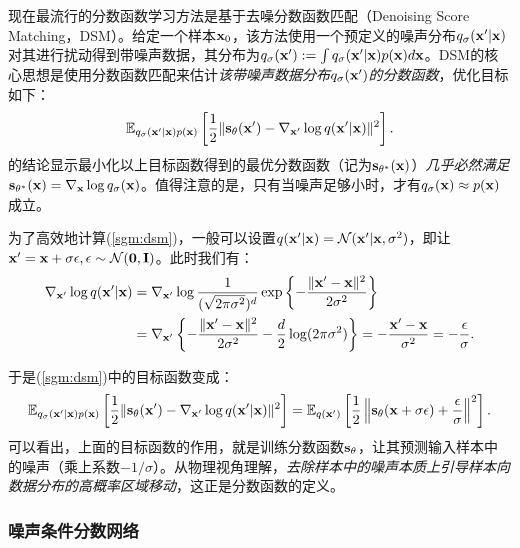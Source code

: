 \documentclass[11pt,a4paper,UTF8]{ctexart}
\begin{document}
现在最流行的分数函数学习方法是基于去噪分数函数匹配（Denoising Score Matching，DSM）\cite{vincent2011connection}。给定一个样本$\mathbf{x}_0$，该方法使用一个预定义的噪声分布$q_\sigma(\mathbf{x}^\prime|\mathbf{x})$对其进行扰动得到带噪声数据，其分布为$q_\sigma(\mathbf{x}^\prime):=\int q_\sigma(\mathbf{x}^\prime|\mathbf{x})p(\mathbf{x})d\mathbf{x}$。DSM的核心思想是使用分数函数匹配来估计\emph{该带噪声数据分布$q_\sigma(\mathbf{x}^\prime)$的分数函数}，优化目标如下：
\begin{equation}
\mathbb{E}_{q_\sigma(\mathbf{x}^\prime|\mathbf{x})p(\mathbf{x})} \left[\frac{1}{2}\| \mathbf{s}_{\theta}(\mathbf{x}^\prime) - \nabla_{\mathbf{x}^\prime}\log q(\mathbf{x}^\prime|\mathbf{x}) \|^2 \right].
\label{sgm:dsm}
\end{equation}
\cite{vincent2011connection}的结论显示最小化以上目标函数得到的最优分数函数（记为$\mathbf{s}_{\theta^*}(\mathbf{x})$）\emph{几乎必然满足}$\mathbf{s}_{\theta^*}(\mathbf{x})=\nabla_{\mathbf{x}}\log q_\sigma(\mathbf{x})$。值得注意的是，只有当噪声足够小时，才有$q_\sigma(\mathbf{x})\approx p(\mathbf{x})$成立。

为了高效地计算(\ref{sgm:dsm})，一般可以设置$q(\mathbf{x}^\prime|\mathbf{x})=\mathcal{N}(\mathbf{x}^\prime|\mathbf{x},\sigma^2)$，即让$\mathbf{x}^\prime=\mathbf{x}+\sigma\epsilon,\epsilon\sim\mathcal{N}(\mathbf{0},\mathbf{I})$。此时我们有：
\begin{align*}
    \nabla_{\mathbf{x}^\prime}\log q(\mathbf{x}^\prime|\mathbf{x}) &= \nabla_{\mathbf{x}^\prime}\log \frac{1}{(\sqrt{2\pi\sigma^2})^d}\exp\left\{-\frac{\|\mathbf{x}^\prime-\mathbf{x} \|^2}{2\sigma^2}\right\} \\
    &= \nabla_{\mathbf{x}^\prime} \left\{ -\frac{\|\mathbf{x}^\prime-\mathbf{x} \|^2}{2\sigma^2} -\frac{d}{2}\log (2\pi\sigma^2) \right\} = -\frac{\mathbf{x}^\prime-\mathbf{x}}{\sigma^2}=-\frac{\epsilon}{\sigma}.
\end{align*}

于是(\ref{sgm:dsm})中的目标函数变成：
\begin{equation}
\mathbb{E}_{q_\sigma(\mathbf{x}^\prime|\mathbf{x})p(\mathbf{x})} \left[\frac{1}{2}\| \mathbf{s}_{\theta}(\mathbf{x}^\prime) - \nabla_{\mathbf{x}^\prime}\log q(\mathbf{x}^\prime|\mathbf{x})  \|^2 \right] = \mathbb{E}_{q(\mathbf{x}^\prime)} \left[ \frac{1}{2}\left\| \mathbf{s}_\theta(\mathbf{x} +\sigma\epsilon)+\frac{\epsilon}{\sigma} \right\|^2\right].
\label{sgm:dsm_obj}
\end{equation}
可以看出，上面的目标函数的作用，就是训练分数函数$\mathbf{s}_\theta$，让其预测输入样本中的噪声（乘上系数$-1/\sigma$）。从物理视角理解，\emph{去除样本中的噪声本质上引导样本向数据分布的高概率区域移动}，这正是分数函数的定义。

\subsubsection{噪声条件分数网络}
\end{document}
